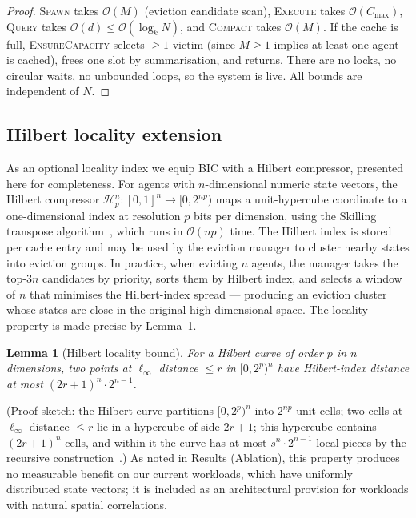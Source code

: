\documentclass[fleqn,10pt]{article}
\newtheorem{lemma}[theorem]{Lemma}
\theoremstyle{definition}
\newcommand{\hilbert}{\mathcal{H}}
\newcommand{\Oh}{\mathcal{O}}
\newcommand{\slots}{M}
\begin{document}
\begin{proof}
\textsc{Spawn} takes $\Oh(\slots)$ (eviction candidate scan),
\textsc{Execute} takes $\Oh(C_{\max})$, \textsc{Query} takes
$\Oh(d) \leq \Oh(\log_k N)$, and \textsc{Compact} takes $\Oh(\slots)$.
If the cache is full, \textsc{EnsureCapacity} selects $\geq 1$ victim
(since $\slots \geq 1$ implies at least one agent is cached), frees
one slot by summarisation, and returns. There are no locks, no
circular waits, no unbounded loops, so the system is live. All
bounds are independent of $N$.
\end{proof}

\subsection*{Hilbert locality extension}

As an optional locality index we equip BIC with a Hilbert
compressor, presented here for completeness. For agents with
$n$-dimensional numeric state vectors, the Hilbert compressor
$\hilbert_p^n: [0,1]^n \to [0, 2^{np})$ maps a unit-hypercube
coordinate to a one-dimensional index at resolution $p$ bits per
dimension, using the Skilling transpose
algorithm~\citep{skilling2004hilbert}, which runs in $\Oh(np)$ time.
The Hilbert index is stored per cache entry and may be used by the
eviction manager to cluster nearby states into eviction groups. In
practice, when evicting $n$ agents, the manager takes the top-$3n$
candidates by priority, sorts them by Hilbert index, and selects a
window of $n$ that minimises the Hilbert-index spread --- producing
an eviction cluster whose states are close in the original
high-dimensional space. The locality property is made precise by
Lemma~\ref{lem:hilbert-locality}.

\begin{lemma}[Hilbert locality bound]
\label{lem:hilbert-locality}
For a Hilbert curve of order $p$ in $n$ dimensions, two points at
$\ell_\infty$ distance $\leq r$ in $[0, 2^p)^n$ have Hilbert-index
distance at most $(2r+1)^n \cdot 2^{n-1}$.
\end{lemma}

\noindent (Proof sketch: the Hilbert curve partitions
$[0, 2^p)^n$ into $2^{np}$ unit cells; two cells at
$\ell_\infty$-distance $\leq r$ lie in a hypercube of side $2r+1$;
this hypercube contains $(2r+1)^n$ cells, and within it the curve
has at most $s^n \cdot 2^{n-1}$ local pieces by the recursive
construction~\citep{butz1971hilbert, moon2001hilbert}.) As noted in
Results (Ablation), this property produces no measurable benefit on
our current workloads, which have uniformly distributed state
vectors; it is included as an architectural provision for workloads
with natural spatial correlations.
\end{document}
